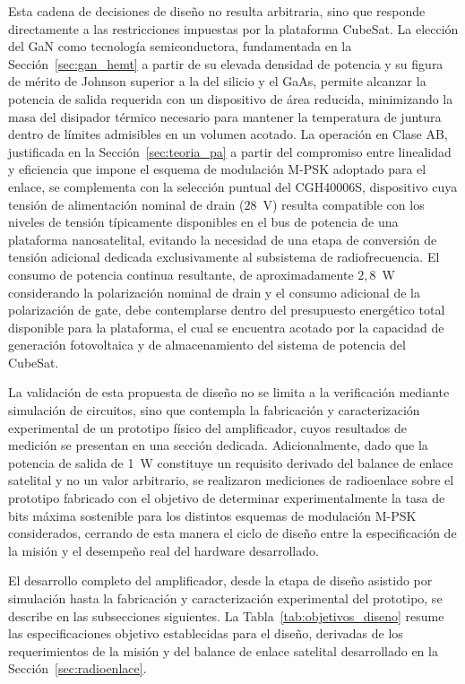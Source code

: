 Esta cadena de decisiones de diseño no resulta arbitraria, sino que responde directamente a las restricciones impuestas por la plataforma CubeSat. La elección del GaN como tecnología semiconductora, fundamentada en la Sección~\ref{sec:gan_hemt} a partir de su elevada densidad de potencia y su figura de mérito de Johnson superior a la del silicio y el GaAs, permite alcanzar la potencia de salida requerida con un dispositivo de área reducida, minimizando la masa del disipador térmico necesario para mantener la temperatura de juntura dentro de límites admisibles en un volumen acotado. La operación en Clase AB, justificada en la Sección~\ref{sec:teoria_pa} a partir del compromiso entre linealidad y eficiencia que impone el esquema de modulación M-PSK adoptado para el enlace, se complementa con la selección puntual del CGH40006S, dispositivo cuya tensión de alimentación nominal de drain ($28$~V) resulta compatible con los niveles de tensión típicamente disponibles en el bus de potencia de una plataforma nanosatelital, evitando la necesidad de una etapa de conversión de tensión adicional dedicada exclusivamente al subsistema de radiofrecuencia. El consumo de potencia continua resultante, de aproximadamente $2{,}8$~W considerando la polarización nominal de drain y el consumo adicional de la polarización de gate, debe contemplarse dentro del presupuesto energético total disponible para la plataforma, el cual se encuentra acotado por la capacidad de generación fotovoltaica y de almacenamiento del sistema de potencia del CubeSat.

La validación de esta propuesta de diseño no se limita a la verificación mediante simulación de circuitos, sino que contempla la fabricación y caracterización experimental de un prototipo físico del amplificador, cuyos resultados de medición se presentan en una sección dedicada. Adicionalmente, dado que la potencia de salida de 1~W constituye un requisito derivado del balance de enlace satelital y no un valor arbitrario, se realizaron mediciones de radioenlace sobre el prototipo fabricado con el objetivo de determinar experimentalmente la tasa de bits máxima sostenible para los distintos esquemas de modulación M-PSK considerados, cerrando de esta manera el ciclo de diseño entre la especificación de la misión y el desempeño real del hardware desarrollado.

El desarrollo completo del amplificador, desde la etapa de diseño asistido por simulación hasta la fabricación y caracterización experimental del prototipo, se describe en las subsecciones siguientes. La Tabla~\ref{tab:objetivos_diseno} resume las especificaciones objetivo establecidas para el diseño, derivadas de los requerimientos de la misión y del balance de enlace satelital desarrollado en la Sección~\ref{sec:radioenlace}.

